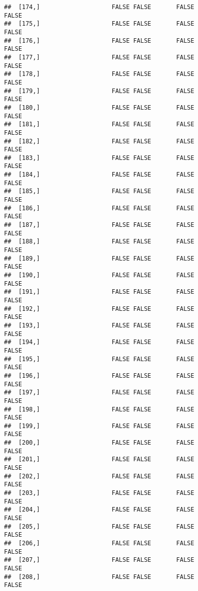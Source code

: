 \documentclass[
]{article}
\begin{document}
\begin{verbatim}
##  [174,]                    FALSE FALSE       FALSE                FALSE
##  [175,]                    FALSE FALSE       FALSE                FALSE
##  [176,]                    FALSE FALSE       FALSE                FALSE
##  [177,]                    FALSE FALSE       FALSE                FALSE
##  [178,]                    FALSE FALSE       FALSE                FALSE
##  [179,]                    FALSE FALSE       FALSE                FALSE
##  [180,]                    FALSE FALSE       FALSE                FALSE
##  [181,]                    FALSE FALSE       FALSE                FALSE
##  [182,]                    FALSE FALSE       FALSE                FALSE
##  [183,]                    FALSE FALSE       FALSE                FALSE
##  [184,]                    FALSE FALSE       FALSE                FALSE
##  [185,]                    FALSE FALSE       FALSE                FALSE
##  [186,]                    FALSE FALSE       FALSE                FALSE
##  [187,]                    FALSE FALSE       FALSE                FALSE
##  [188,]                    FALSE FALSE       FALSE                FALSE
##  [189,]                    FALSE FALSE       FALSE                FALSE
##  [190,]                    FALSE FALSE       FALSE                FALSE
##  [191,]                    FALSE FALSE       FALSE                FALSE
##  [192,]                    FALSE FALSE       FALSE                FALSE
##  [193,]                    FALSE FALSE       FALSE                FALSE
##  [194,]                    FALSE FALSE       FALSE                FALSE
##  [195,]                    FALSE FALSE       FALSE                FALSE
##  [196,]                    FALSE FALSE       FALSE                FALSE
##  [197,]                    FALSE FALSE       FALSE                FALSE
##  [198,]                    FALSE FALSE       FALSE                FALSE
##  [199,]                    FALSE FALSE       FALSE                FALSE
##  [200,]                    FALSE FALSE       FALSE                FALSE
##  [201,]                    FALSE FALSE       FALSE                FALSE
##  [202,]                    FALSE FALSE       FALSE                FALSE
##  [203,]                    FALSE FALSE       FALSE                FALSE
##  [204,]                    FALSE FALSE       FALSE                FALSE
##  [205,]                    FALSE FALSE       FALSE                FALSE
##  [206,]                    FALSE FALSE       FALSE                FALSE
##  [207,]                    FALSE FALSE       FALSE                FALSE
##  [208,]                    FALSE FALSE       FALSE                FALSE

\end{verbatim}
\end{document}
